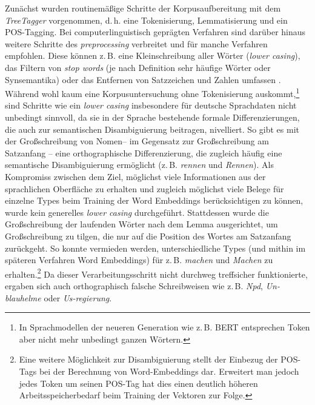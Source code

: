 Zunächst wurden routinemäßige Schritte der Korpusaufbereitung mit dem \emph{TreeTagger} \autocite{schmidProbabilisticPartSpeechTagging1994} vorgenommen, d.\,h. eine Tokenisierung, Lemmatisierung und ein POS-Tagging. Bei computerlinguistisch geprägten Verfahren sind darüber hinaus weitere Schritte des \emph{preprocessing} verbreitet und für manche Verfahren empfohlen. Diese können z.\,B. eine Kleinschreibung aller Wörter (\emph{lower casing}), das Filtern von \emph{stop words} (je nach Definition sehr häufige Wörter oder Synsemantika) oder das Entfernen von Satzzeichen und Zahlen umfassen \autocite{schumacherPreprocessingMitNLTK2022}. Während wohl kaum eine Korpusuntersuchung ohne Tokenisierung auskommt,\footnote{In Sprachmodellen der neueren Generation wie z.\,B. BERT entsprechen Token aber nicht mehr unbedingt ganzen Wörtern.} sind Schritte wie ein \emph{lower casing} insbesondere für deutsche Sprachdaten nicht unbedingt sinnvoll, da sie in der Sprache bestehende formale Differenzierungen, die auch zur semantischen Disambiguierung beitragen, nivelliert. So gibt es mit der Großschreibung von Nomen-- im Gegensatz zur Großschreibung am Satzanfang -- eine orthographische Differenzierung, die zugleich häufig eine semantische Disambiguierung ermöglicht (z.\,B. \emph{rennen} und \emph{Rennen}). Als Kompromiss zwischen dem Ziel, möglichst viele Informationen aus der sprachlichen Oberfläche zu erhalten und zugleich möglichst viele Belege für einzelne Types beim Training der Word Embeddings berücksichtigen zu können, wurde kein generelles \emph{lower casing} durchgeführt. Stattdessen wurde die Großschreibung der laufenden Wörter nach dem Lemma ausgerichtet, um Großschreibung zu tilgen, die nur auf die Position des Wortes am Satzanfang zurückgeht. So konnte vermieden werden, unterschiedliche Types (und mithin im späteren Verfahren Word Embeddings) für z.\,B. \emph{machen} und \emph{Machen} zu erhalten.\footnote{Eine weitere Möglichkeit zur Disambiguierung stellt der Einbezug der POS-Tags bei der Berechnung von Word-Embeddings dar. Erweitert man jedoch jedes Token um seinen POS-Tag hat dies einen deutlich höheren Arbeitsspeicherbedarf beim Training der Vektoren zur Folge.} Da dieser Verarbeitungsschritt nicht durchweg treffsicher funktionierte, ergaben sich auch orthographisch falsche Schreibweisen wie z.\,B. \emph{Npd}, \emph{Un-blauhelme} oder \emph{Us-regierung}.

